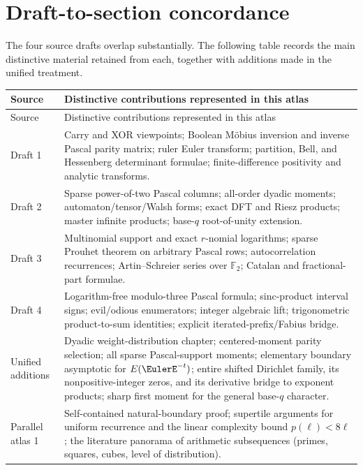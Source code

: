\documentclass[11pt,oneside]{article}
\numberwithin{equation}{section}
\theoremstyle{definition}
\theoremstyle{remark}
\begin{document}
\section[Draft concordance]{Draft-to-section concordance}
\label{p1:app:draft-concordance}

The four source drafts overlap substantially.  The following table records
the main distinctive material retained from each, together with additions made
in the unified treatment.

\renewcommand{\arraystretch}{1.16}
\begin{longtable}{@{}p{}p{}@{}}
\toprule
Source & Distinctive contributions represented in this atlas \\
\midrule
\endfirsthead
\toprule
Source & Distinctive contributions represented in this atlas \\
\midrule
\endhead
Draft 1 & Carry and XOR viewpoints; Boolean M\"obius inversion and inverse Pascal parity matrix; ruler Euler transform; partition, Bell, and Hessenberg determinant formulae; finite-difference positivity and analytic transforms. \\
Draft 2 & Sparse power-of-two Pascal columns; all-order dyadic moments; automaton/tensor/Walsh forms; exact DFT and Riesz products; master infinite products; base-\(q\) root-of-unity extension. \\
Draft 3 & Multinomial support and exact \(r\)-nomial logarithms; sparse Prouhet theorem on arbitrary Pascal rows; autocorrelation recurrences; Artin--Schreier series over \(\mathbb F_2\); Catalan and fractional-part formulae. \\
Draft 4 & Logarithm-free modulo-three Pascal formula; sinc-product interval signs; evil/odious enumerators; integer algebraic lift; trigonometric product-to-sum identities; explicit iterated-prefix/Fabius bridge. \\
Unified additions & Dyadic weight-distribution chapter; centered-moment parity selection; all sparse Pascal-support moments; elementary boundary asymptotic for \(E(\EulerE^{-t})\); entire shifted Dirichlet family, its nonpositive-integer zeros, and its derivative bridge to exponent products; sharp first moment for the general base-\(q\) character. \\
\midrule
Parallel atlas 1 & Self-contained natural-boundary proof; supertile arguments for uniform recurrence and the linear complexity bound \(p(\ell)<8\ell\); the literature panorama of arithmetic subsequences (primes, squares, cubes, level of distribution). \\

\end{longtable}
\end{document}
